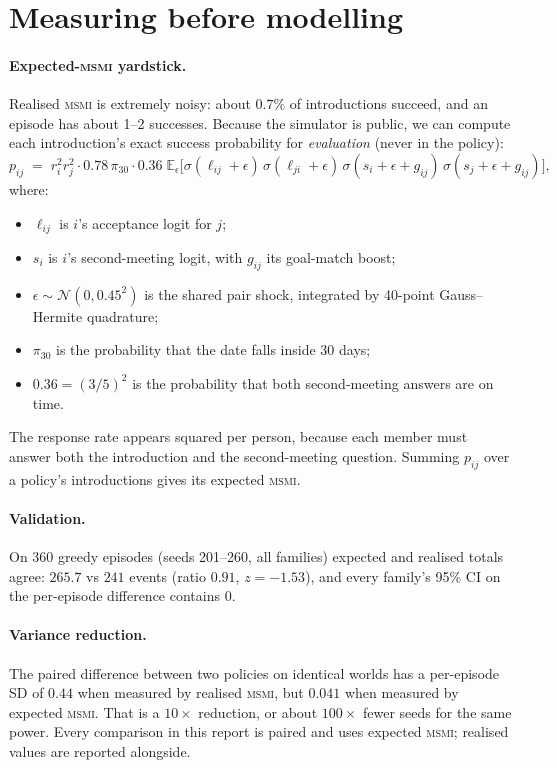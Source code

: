 \documentclass[10pt]{article}
\newcommand{\msmi}{\textsc{msmi}}
\begin{document}
\section{Measuring before modelling}\label{sec:yardstick}

\paragraph{Expected-\msmi{} yardstick.}
Realised \msmi{} is extremely noisy: about $0.7\%$ of introductions succeed, and an episode has about 1--2 successes. Because the simulator is public, we can compute each introduction's exact success probability for \emph{evaluation} (never in the policy):
\begin{equation}
p_{ij} \;=\; r_i^2 r_j^2 \cdot 0.78\,\pi_{30} \cdot 0.36 \;\mathbb{E}_{\epsilon}\!\big[\sigma(\ell_{ij}+\epsilon)\,\sigma(\ell_{ji}+\epsilon)\,\sigma(s_i+\epsilon+g_{ij})\,\sigma(s_j+\epsilon+g_{ij})\big],
\end{equation}
where:
\begin{itemize}
\item $\ell_{ij}$ is $i$'s acceptance logit for $j$;
\item $s_i$ is $i$'s second-meeting logit, with $g_{ij}$ its goal-match boost;
\item $\epsilon\sim\mathcal{N}(0,0.45^2)$ is the shared pair shock, integrated by 40-point Gauss--Hermite quadrature;
\item $\pi_{30}$ is the probability that the date falls inside 30 days;
\item $0.36=(3/5)^2$ is the probability that both second-meeting answers are on time.
\end{itemize}
The response rate appears squared per person, because each member must answer both the introduction and the second-meeting question. Summing $p_{ij}$ over a policy's introductions gives its expected \msmi.

\paragraph{Validation.} On 360 greedy episodes (seeds 201--260, all families) expected and realised totals agree: $265.7$ vs $241$ events (ratio $0.91$, $z=-1.53$), and every family's 95\% CI on the per-episode difference contains $0$.

\paragraph{Variance reduction.} The paired difference between two policies on identical worlds has a per-episode SD of $0.44$ when measured by realised \msmi{}, but $0.041$ when measured by expected \msmi{}. That is a $10\times$ reduction, or about $100\times$ fewer seeds for the same power. Every comparison in this report is paired and uses expected \msmi{}; realised values are reported alongside.
\end{document}
